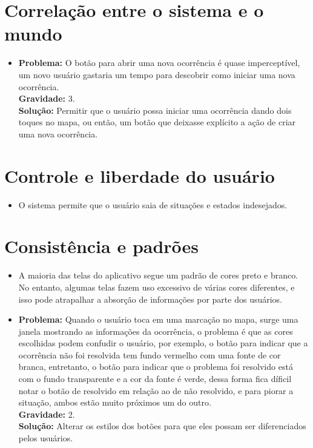 \documentclass[a4paper,12pt,twoside]{report}
\begin{document}
\section{Correlação entre o sistema e o mundo}
\begin{itemize}
\item \textbf{Problema:} O botão para abrir uma nova ocorrência é quase imperceptível, um novo
  usuário gastaria um tempo para descobrir como iniciar uma nova ocorrência.\\
\textbf{Gravidade:} 3.\\
\textbf{Solução:} Permitir que o usuário possa iniciar uma ocorrência dando dois toques no mapa,
ou então, um botão que deixasse explícito a ação de criar uma nova ocorrência.
\end{itemize}

\section{Controle e liberdade do usuário}
\begin{itemize}
\item O sistema permite que o usuário saia de situações e estados indesejados. 
\end{itemize}
    
\section{Consistência e padrões}
\begin{itemize}
\item A maioria das telas do aplicativo segue um padrão de cores preto e branco. No
  entanto, algumas telas fazem uso excessivo de várias cores diferentes, e isso pode atrapalhar
  a absorção de informações por parte dos usuários.\\
  \item \textbf{Problema:} Quando o usuário toca em uma marcação no mapa, surge uma janela mostrando
  as informações da ocorrência, o problema é que as cores
  escolhidas podem confudir o usuário, por exemplo, o botão para indicar que a
  ocorrência não foi resolvida tem fundo vermelho com uma fonte de cor branca,
  entretanto, o botão para indicar que o problema foi resolvido está com o fundo
  transparente e a cor da fonte é verde, dessa forma fica díficil notar o botão de
  resolvido em relação ao de não resolvido, e para piorar a situação, ambos estão muito próximos um do
  outro.\\
\textbf{Gravidade:} 2.\\
\textbf{Solução:} Alterar os estilos dos botões para que eles possam ser diferenciados
  pelos usuários.
\end{itemize}
\end{document}
